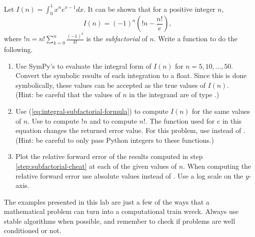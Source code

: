 \begin{problem}
Let $I(n) = \int_0^1 x^n e^{x - 1} dx$.
It can be shown that for a positive integer $n$,
\begin{equation}
I(n) = (-1)^n(!n - \frac{n!}{e}),
\label{eq:integral-subfactorial-formula}
\end{equation}
where $!n=n!\sum_{k=0}^{n} \frac{(-1)^k}{k!}$ is the \emph{subfactorial} of $n$.
Write a function to do the following.
\begin{enumerate}
\item Use SymPy's  to evaluate the integral form of $I(n)$ for $n=5,10,\ldots,50$.
Convert the symbolic results of each integration to a float.
Since this is done symbolically, these values can be accepted as the true values of $I(n)$.
\\(Hint: be careful that the values of $n$ in the integrand are of type .)

\item Use (\ref{eq:integral-subfactorial-formula}) to compute $I(n)$ for the same values of $n$.
Use  to compute $!n$ and  to compute $n!$.
The function used for $e$ in this equation changes the returned error value. 
For this problem, use  instead of .
\\(Hint: be careful to only pass Python integers to these functions.)
\label{step:subfactorial-cheat}

\item Plot the relative forward error of the results computed in step \ref{step:subfactorial-cheat} at each of the given values of $n$.
When computing the relative forward error use absolute values instead of .
Use a log scale on the $y$-axis.

\end{enumerate}
\end{problem}

The examples presented in this lab are just a few of the ways that a mathematical problem can turn into a computational train wreck.
Always use stable algorithms when possible, and remember to check if problems are well conditioned or not.

